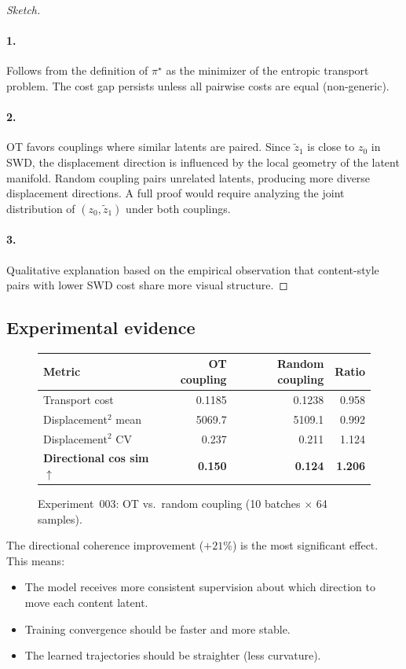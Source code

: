 \documentclass[letterpaper]{article}
\begin{document}
\begin{proof}[Sketch]
\paragraph{1.} Follows from the definition of $\pi^\star$ as the minimizer
of the entropic transport problem. The cost gap persists unless all
pairwise costs are equal (non-generic).

\paragraph{2.} OT favors couplings where similar latents are paired.
Since $\tilde z_1$ is close to $z_0$ in SWD, the displacement direction
is influenced by the local geometry of the latent manifold. Random coupling
pairs unrelated latents, producing more diverse displacement directions.
A full proof would require analyzing the joint distribution of
$(z_0, \tilde z_1)$ under both couplings.

\paragraph{3.} Qualitative explanation based on the empirical observation
that content-style pairs with lower SWD cost share more visual structure.
\end{proof}

\subsection{Experimental evidence}

\begin{figure}[h]
\centering
\begin{tabular}{lrrr}
\toprule
Metric & OT coupling & Random coupling & Ratio \\
\midrule
Transport cost & 0.1185 & 0.1238 & 0.958 \\
Displacement$^2$ mean & 5069.7 & 5109.1 & 0.992 \\
Displacement$^2$ CV & 0.237 & 0.211 & 1.124 \\
\textbf{Directional cos sim} $\uparrow$ & \textbf{0.150} & \textbf{0.124} & \textbf{1.206} \\
\bottomrule
\end{tabular}
\caption{Experiment~003: OT vs.\ random coupling (10 batches $\times$ 64 samples).}
\label{fig:ot_vs_random}
\end{figure}

The directional coherence improvement ($+21\%$) is the most significant
effect. This means:
\begin{itemize}[nosep]
    \item The model receives more consistent supervision about which
    direction to move each content latent.
    \item Training convergence should be faster and more stable.
    \item The learned trajectories should be straighter (less curvature).
\end{itemize}
\end{document}
